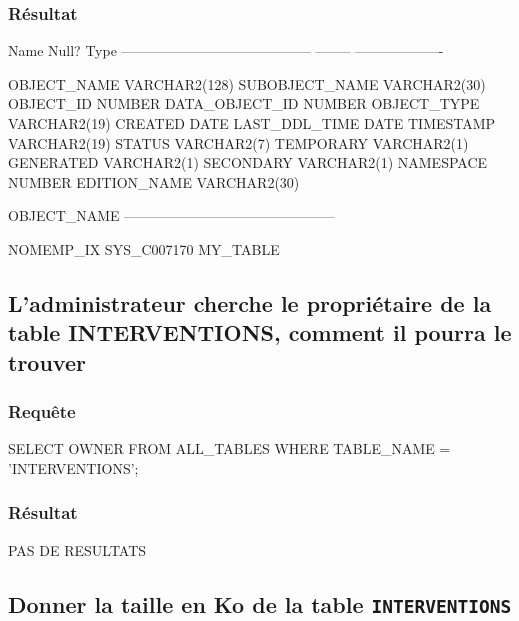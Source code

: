 \documentclass[•]{article}
\begin{document}
\subsubsection{Résultat}
\begin{sql}
  Name                                      Null?    Type
 ----------------------------------------- -------- -------------------

 OBJECT_NAME                                        VARCHAR2(128)
 SUBOBJECT_NAME                                     VARCHAR2(30)
 OBJECT_ID                                          NUMBER
 DATA_OBJECT_ID                                     NUMBER
 OBJECT_TYPE                                        VARCHAR2(19)
 CREATED                                            DATE
 LAST_DDL_TIME                                      DATE
 TIMESTAMP                                          VARCHAR2(19)
 STATUS                                             VARCHAR2(7)
 TEMPORARY                                          VARCHAR2(1)
 GENERATED                                          VARCHAR2(1)
 SECONDARY                                          VARCHAR2(1)
 NAMESPACE                                          NUMBER
 EDITION_NAME                                       VARCHAR2(30)

OBJECT_NAME
---------------------------------------------

NOMEMP_IX
SYS_C007170
MY_TABLE
\end{sql}

\subsection{L’administrateur cherche le propriétaire de la table INTERVENTIONS, comment il pourra le trouver}
\subsubsection{Requête}
\begin{sql}
SELECT OWNER FROM ALL_TABLES WHERE TABLE_NAME = 'INTERVENTIONS';
\end{sql}
\subsubsection{Résultat}
\begin{sql}
PAS DE RESULTATS
\end{sql}

\subsection{Donner la taille en Ko de la table \texttt{INTERVENTIONS}}
\end{document}
